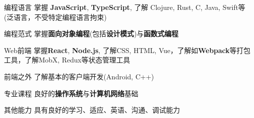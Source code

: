 

\begin{cvskills}

    \cvskill
    {编程语言} %
    {掌握 \textbf{JavaScript}, \textbf{TypeScript}, 了解 Clojure, Rust, C, Java, Swift等(泛语言，不受特定编程语言拘束)} %

    \cvskill
    {编程范式} %
    {掌握\textbf{面向对象编程}(包括\textbf{设计模式})与\textbf{函数式编程}} %

    \cvskill
    {Web前端} %
    {掌握\textbf{React}, \textbf{Node.js}, 了解CSS, HTML, Vue，了解如\textbf{Webpack}等打包工具，了解MobX, Redux等状态管理工具} %

    \cvskill
    {前端之外} %
    {了解基本的客户端开发(Android, C++)} %

    \cvskill
    {专业课程} %
    {良好的\textbf{操作系统}与\textbf{计算机网络}基础} %

    \cvskill
    {其他能力} %
    {具有良好的学习、适应、英语、沟通、调试能力}

\end{cvskills}
